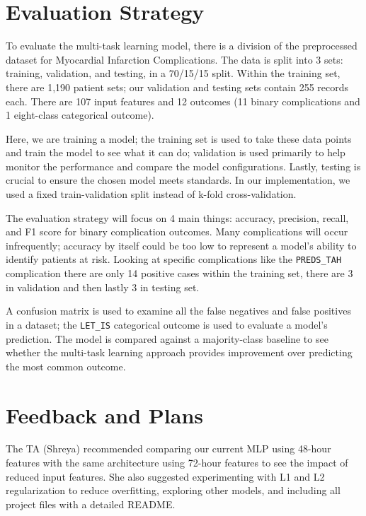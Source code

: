 \documentclass[11pt]{article}
\begin{document}
\section{Evaluation Strategy}

To evaluate the multi-task learning model, there is a division of the preprocessed dataset for Myocardial Infarction Complications. The data is split into 3 sets: training, validation, and testing, in a 70/15/15 split. Within the training set, there are 1,190 patient sets; our validation and testing sets contain 255 records each. There are 107 input features and 12 outcomes (11 binary complications and 1 eight-class categorical outcome).

Here, we are training a model; the training set is used to take these data points and train the model to see what it can do; validation is used primarily to help monitor the performance and compare the model configurations. Lastly, testing is crucial to ensure the chosen model meets standards. In our implementation, we used a fixed train-validation split instead of k-fold cross-validation.

The evaluation strategy will focus on 4 main things: accuracy, precision, recall, and F1 score for binary complication outcomes. Many complications will occur infrequently; accuracy by itself could be too low to represent a model's ability to identify patients at risk. Looking at specific complications like the \texttt{PREDS\_TAH} complication there are only 14 positive cases within the training set, there are 3 in validation and then lastly 3 in testing set.

A confusion matrix is used to examine all the false negatives and false positives in a dataset; the \texttt{LET\_IS} categorical outcome is used to evaluate a model's prediction. The model is compared against a majority-class baseline to see whether the multi-task learning approach provides improvement over predicting the most common outcome.

\section{Feedback and Plans}

The TA (Shreya) recommended comparing our current MLP using 48-hour features with the same architecture using 72-hour features to see the impact of reduced input features. She also suggested experimenting with L1 and L2 regularization to reduce overfitting, exploring other models, and including all project files with a detailed README.
\end{document}

